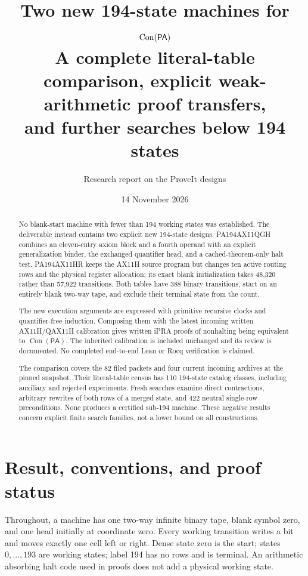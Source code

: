 \documentclass[11pt,letterpaper]{article}
\title{Two new 194-state machines for $\Con(\PA)$\\[5pt]
\large A complete literal-table comparison, explicit weak-arithmetic proof transfers,\\and further searches below 194 states}
\author{Research report on the ProveIt designs}
\date{14 November 2026}
\newcommand{\PA}{\mathsf{PA}}
\newcommand{\Con}{\operatorname{Con}}
\begin{document}
\maketitle
\begin{abstract}
No blank-start machine with fewer than 194 working states was established.
The deliverable instead contains two explicit new 194-state designs.
PA194AX11QGH combines an eleven-entry axiom block and a fourth operand with
an explicit generalization binder, the exchanged quantifier head, and a
cached-theorem-only halt test. PA194AX11HR keeps the AX11H source program
but changes ten active routing rows and the physical register allocation;
its exact blank initialization takes 48,320 rather than 57,922 transitions.
Both tables have 388 binary transitions, start on an entirely blank two-way
tape, and exclude their terminal state from the count.

The new execution arguments are expressed with primitive recursive clocks
and quantifier-free induction. Composing them with the latest incoming
written AX11H/QAX11H calibration gives written iPRA proofs of
nonhalting being equivalent to $\Con(\PA)$. The inherited calibration is
included unchanged and its review is documented. No completed end-to-end
Lean or Rocq verification is claimed.

The comparison covers the 82 filed packets and four current incoming
archives at the pinned snapshot. Their literal-table census has 110
194-state catalog classes, including auxiliary and rejected experiments.
Fresh searches examine direct contractions, arbitrary rewrites of both
rows of a merged state, and 422 neutral single-row preconditions. None
produces a certified sub-194 machine. These negative results concern
explicit finite search families, not a lower bound on all constructions.
\end{abstract}
\tableofcontents
\clearpage

\section{Result, conventions, and proof status}

Throughout, a machine has one two-way infinite binary tape, blank symbol
zero, and one head initially at coordinate zero. Every working transition
writes a bit and moves exactly one cell left or right. Dense state zero is
the start; states $0,\ldots,193$ are working states; label 194 has no rows
and is terminal. An arithmetic absorbing halt code used in proofs does not
add a physical working state.
\end{document}

